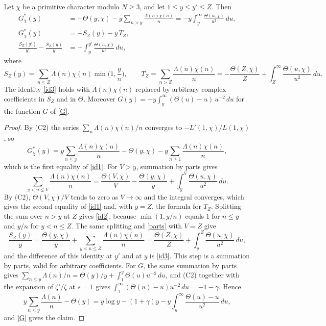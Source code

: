 \begin{lemma}\label{gchisplit}
Let $\chi$ be a primitive character modulo $N\ge3$, and let $1\le y\le y'\le Z$. Then
\begin{align}
G^\ast_\chi(y)&=-\Theta(y,\chi)-y\sum_{n>y}\frac{\Lambda(n)\chi(n)}{n}=-y\int_y^\infty\frac{\Theta(u,\chi)}{u^2}\,du,\label{id1}\\
G^\ast_\chi(y)&=-S_Z(y)-y\,T_Z,\label{id2}\\
\frac{S_Z(y')}{y'}-\frac{S_Z(y)}{y}&=-\int_y^{y'}\frac{\Theta(u,\chi)}{u^2}\,du,\label{id3}
\end{align}
where
\[
S_Z(y)=\sum_{n\le Z}\Lambda(n)\chi(n)\min\Big(1,\frac yn\Big),\qquad T_Z=\sum_{n>Z}\frac{\Lambda(n)\chi(n)}{n}=-\frac{\Theta(Z,\chi)}{Z}+\int_Z^\infty\frac{\Theta(u,\chi)}{u^2}\,du .
\]
The identity \eqref{id3} holds with $\Lambda(n)\chi(n)$ replaced by arbitrary complex coefficients in $S_Z$ and in $\Theta$. Moreover $G(y)=-y\int_y^\infty(\Theta(u)-u)\,u^{-2}\,du$ for the function $G$ of \eqref{G}.
\end{lemma}

\begin{proof}
By (C2) the series $\sum_n\Lambda(n)\chi(n)/n$ converges to $-L'(1,\chi)/L(1,\chi)$, so
\[
G^\ast_\chi(y)=y\sum_{n\le y}\frac{\Lambda(n)\chi(n)}n-\Theta(y,\chi)-y\sum_{n\ge1}\frac{\Lambda(n)\chi(n)}n ,
\]
which is the first equality of \eqref{id1}. For $V>y$, summation by parts gives
\begin{equation}\label{parts}
\sum_{y<n\le V}\frac{\Lambda(n)\chi(n)}n=\frac{\Theta(V,\chi)}V-\frac{\Theta(y,\chi)}y+\int_y^V\frac{\Theta(u,\chi)}{u^2}\,du .
\end{equation}
By (C2), $\Theta(V,\chi)/V$ tends to zero as $V\to\infty$ and the integral converges, which gives the second equality of \eqref{id1} and, with $y=Z$, the formula for $T_Z$. Splitting the sum over $n>y$ at $Z$ gives \eqref{id2}, because $\min(1,y/n)$ equals $1$ for $n\le y$ and $y/n$ for $y<n\le Z$. The same splitting and \eqref{parts} with $V=Z$ give
\[
\frac{S_Z(y)}y=\frac{\Theta(y,\chi)}y+\sum_{y<n\le Z}\frac{\Lambda(n)\chi(n)}n=\frac{\Theta(Z,\chi)}Z+\int_y^Z\frac{\Theta(u,\chi)}{u^2}\,du ,
\]
and the difference of this identity at $y'$ and at $y$ is \eqref{id3}. This step is a summation by parts, valid for arbitrary coefficients. For $G$, the same summation by parts gives $\sum_{n\le y}\Lambda(n)/n=\Theta(y)/y+\int_1^y\Theta(u)u^{-2}\,du$, and (C2) together with the expansion of $\zeta'/\zeta$ at $s=1$ gives $\int_1^\infty(\Theta(u)-u)u^{-2}\,du=-1-\gamma$. Hence
\[
y\sum_{n\le y}\frac{\Lambda(n)}n-\Theta(y)=y\log y-(1+\gamma)y-y\int_y^\infty\frac{\Theta(u)-u}{u^2}\,du ,
\]
and \eqref{G} gives the claim.
\end{proof}

